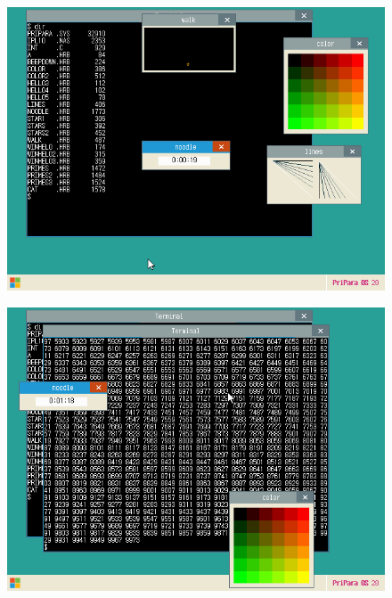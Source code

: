 
\begin{figure}[htp]
    \centering
    \includegraphics[width=12cm]{image/p3.png}
    \caption{}
    \label{fig:p3}
\end{figure}

\begin{figure}[htp]
    \centering
    \includegraphics[width=12cm]{image/p4.png}
    \caption{}
    \label{fig:p4}
\end{figure}


